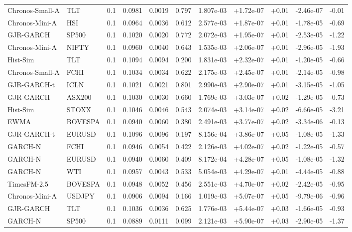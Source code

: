 \begin{tabular}{llrrrrrrrrr}
Chronos-Small-A & TLT & 0.1 & 0.0981 & 0.0019 & 0.797 & 1.807e-03 & +1.72e-07 & +0.01 & -2.46e-07 & -0.01 \\
Chronos-Mini-A & HSI & 0.1 & 0.0964 & 0.0036 & 0.612 & 2.577e-03 & +1.87e-07 & +0.01 & -1.78e-05 & -0.69 \\
GJR-GARCH & SP500 & 0.1 & 0.1020 & 0.0020 & 0.772 & 2.072e-03 & +1.95e-07 & +0.01 & -2.53e-05 & -1.22 \\
Chronos-Mini-A & NIFTY & 0.1 & 0.0960 & 0.0040 & 0.643 & 1.535e-03 & +2.06e-07 & +0.01 & -2.96e-05 & -1.93 \\
Hist-Sim & TLT & 0.1 & 0.1094 & 0.0094 & 0.200 & 1.831e-03 & +2.32e-07 & +0.01 & -1.20e-05 & -0.66 \\
Chronos-Small-A & FCHI & 0.1 & 0.1034 & 0.0034 & 0.622 & 2.175e-03 & +2.45e-07 & +0.01 & -2.14e-05 & -0.98 \\
GJR-GARCH-t & ICLN & 0.1 & 0.1021 & 0.0021 & 0.801 & 2.990e-03 & +2.90e-07 & +0.01 & -3.15e-05 & -1.05 \\
GJR-GARCH & ASX200 & 0.1 & 0.1030 & 0.0030 & 0.660 & 1.769e-03 & +3.03e-07 & +0.02 & -1.29e-05 & -0.73 \\
Hist-Sim & STOXX & 0.1 & 0.1046 & 0.0046 & 0.543 & 2.074e-03 & +3.14e-07 & +0.02 & -6.66e-05 & -3.21 \\
EWMA & BOVESPA & 0.1 & 0.0940 & 0.0060 & 0.380 & 2.491e-03 & +3.77e-07 & +0.02 & -3.34e-06 & -0.13 \\
GJR-GARCH-t & EURUSD & 0.1 & 0.1096 & 0.0096 & 0.197 & 8.156e-04 & +3.86e-07 & +0.05 & -1.08e-05 & -1.33 \\
GARCH-N & FCHI & 0.1 & 0.0946 & 0.0054 & 0.422 & 2.126e-03 & +4.02e-07 & +0.02 & -1.22e-05 & -0.57 \\
GARCH-N & EURUSD & 0.1 & 0.0940 & 0.0060 & 0.409 & 8.172e-04 & +4.28e-07 & +0.05 & -1.08e-05 & -1.32 \\
GARCH-N & WTI & 0.1 & 0.0957 & 0.0043 & 0.533 & 5.054e-03 & +4.29e-07 & +0.01 & -4.44e-05 & -0.88 \\
TimesFM-2.5 & BOVESPA & 0.1 & 0.0948 & 0.0052 & 0.456 & 2.551e-03 & +4.70e-07 & +0.02 & -2.42e-05 & -0.95 \\
Chronos-Mini-A & USDJPY & 0.1 & 0.0906 & 0.0094 & 0.166 & 1.019e-03 & +5.07e-07 & +0.05 & -9.79e-06 & -0.96 \\
GJR-GARCH & TLT & 0.1 & 0.1036 & 0.0036 & 0.625 & 1.776e-03 & +5.44e-07 & +0.03 & -1.66e-05 & -0.93 \\
GARCH-N & SP500 & 0.1 & 0.0889 & 0.0111 & 0.099 & 2.121e-03 & +5.90e-07 & +0.03 & -2.90e-05 & -1.37 \\

\end{tabular}

